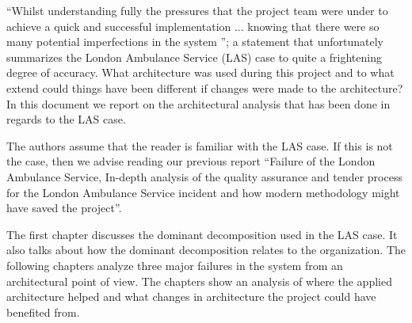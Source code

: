 ``Whilst understanding fully the pressures that the project team were under to achieve a quick and successful implementation ...
knowing that there were so many potential imperfections in the system \autocite[4002]{officialreport}'';
a statement that unfortunately summarizes the London Ambulance Service (LAS) case to quite a frightening degree of accuracy.
What architecture was used during this project and to what extend could things have been different if changes were made to the architecture?
In this document we report on the architectural analysis that has been done in regards to the LAS case.

The authors assume that the reader is familiar with the LAS case.
If this is not the case, then we advise reading our previous report
``Failure of the London Ambulance Service, In-depth analysis of the quality assurance and tender process for the London Ambulance Service incident and how modern methodology might have saved the project''.

The first chapter discusses the dominant decomposition used in the LAS case.
It also talks about how the dominant decomposition relates to the organization.
The following chapters analyze three major failures in the system from an architectural point of view.
The chapters show an analysis of where the applied architecture helped and what changes in architecture the project could have benefited from.
